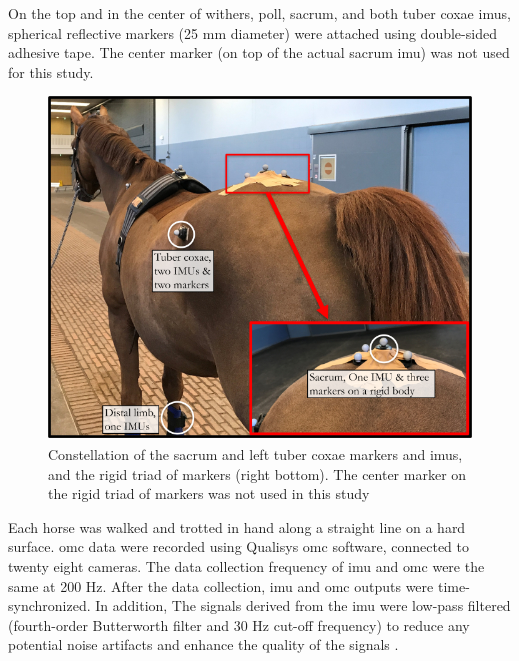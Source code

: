 On the top and in the center of withers, poll, sacrum, and both tuber coxae \gls{imu}s, spherical reflective markers (25 mm diameter) were attached using double-sided adhesive tape. The center marker (on top of the actual sacrum \gls{imu}) was not used for this study.


\begin{figure}[tb]

\includegraphics[width=.95\linewidth]{chapters/Pelvis/figures/1.jpg}
\caption{Constellation of the sacrum and left tuber coxae markers and \gls{imu}s, and the rigid triad of markers (right bottom). The center marker on the rigid triad of markers was not used in this study}
\label{bigpic}
\end{figure}

 

Each horse was walked and trotted in hand along a straight line on a hard surface. \gls{omc} data were recorded using Qualisys \gls{omc} software, connected to twenty eight cameras. The data collection frequency of \gls{imu} and \gls{omc} were the same at 200 Hz. After the data collection, \gls{imu} and \gls{omc} outputs were time-synchronized. In addition, The signals derived from the \gls{imu} were low-pass filtered (fourth-order Butterworth filter and 30 Hz cut-off frequency) to reduce any potential noise artifacts and enhance the quality of the signals  \cite{456}. 

